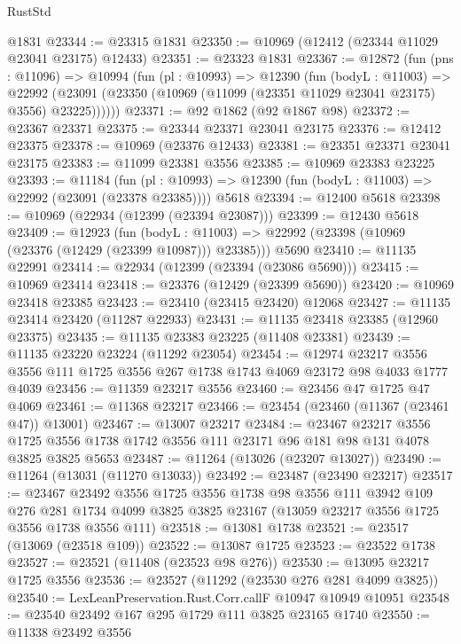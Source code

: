 \begin{lexlean}{RustStd}
\begin{coremodule}
    @1831
@23344 := @23315 @1831
@23350 := @10969 (@12412 (@23344 @11029 @23041 @23175) @12433)
@23351 := @23323 @1831
@23367 := @12872
    (fun (pns : @11096) =>
    @10994
      (fun (pl : @10993) =>
      @12390
        (fun (bodyL : @11003) =>
        @22992 (@23091 (@23350 (@10969 (@11099 (@23351 @11029 @23041 @23175) @3556) @23225))))))
@23371 := @92 @1862 (@92 @1867 @98)
@23372 := @23367 @23371
@23375 := @23344 @23371 @23041 @23175
@23376 := @12412 @23375
@23378 := @10969 (@23376 @12433)
@23381 := @23351 @23371 @23041 @23175
@23383 := @11099 @23381 @3556
@23385 := @10969 @23383 @23225
@23393 := @11184
    (fun (pl : @10993) => @12390 (fun (bodyL : @11003) => @22992 (@23091 (@23378 @23385))))
    @5618
@23394 := @12400 @5618
@23398 := @10969 (@22934 (@12399 (@23394 @23087)))
@23399 := @12430 @5618
@23409 := @12923
    (fun (bodyL : @11003) => @22992 (@23398 (@10969 (@23376 (@12429 (@23399 @10987))) @23385)))
    @5690
@23410 := @11135 @22991
@23414 := @22934 (@12399 (@23394 (@23086 @5690)))
@23415 := @10969 @23414
@23418 := @23376 (@12429 (@23399 @5690))
@23420 := @10969 @23418 @23385
@23423 := @23410 (@23415 @23420) @12068
@23427 := @11135 @23414 @23420 (@11287 @22933)
@23431 := @11135 @23418 @23385 (@12960 @23375)
@23435 := @11135 @23383 @23225 (@11408 @23381)
@23439 := @11135 @23220 @23224 (@11292 @23054)
@23454 := @12974
    @23217
    @3556
    @3556
    @111
    @1725
    @3556
    @267
    @1738
    @1743
    @4069
    @23172
    @98
    @4033
    @1777
    @4039
@23456 := @11359 @23217 @3556
@23460 := @23456 @47 @1725 @47 @4069
@23461 := @11368 @23217
@23466 := @23454 (@23460 (@11367 (@23461 @47)) @13001)
@23467 := @13007 @23217
@23484 := @23467
    @23217
    @3556
    @1725
    @3556
    @1738
    @1742
    @3556
    @111
    @23171
    @96
    @181
    @98
    @131
    @4078
    @3825
    @3825
    @5653
@23487 := @11264 (@13026 (@23207 @13027))
@23490 := @11264 (@13031 (@11270 @13033))
@23492 := @23487 (@23490 @23217)
@23517 := @23467
    @23492
    @3556
    @1725
    @3556
    @1738
    @98
    @3556
    @111
    @3942
    @109
    @276
    @281
    @1734
    @4099
    @3825
    @3825
    @23167
    (@13059 @23217 @3556 @1725 @3556 @1738 @3556 @111)
@23518 := @13081 @1738
@23521 := @23517 (@13069 (@23518 @109))
@23522 := @13087 @1725
@23523 := @23522 @1738
@23527 := @23521 (@11408 (@23523 @98 @276))
@23530 := @13095 @23217 @1725 @3556
@23536 := @23527 (@11292 (@23530 @276 @281 @4099 @3825))
@23540 := LexLeanPreservation.Rust.Corr.callF @10947 @10949 @10951
@23548 := @23540 @23492 @167 @295 @1729 @111 @3825 @23165 @1740
@23550 := @11338 @23492 @3556

\end{coremodule}
\end{lexlean}
